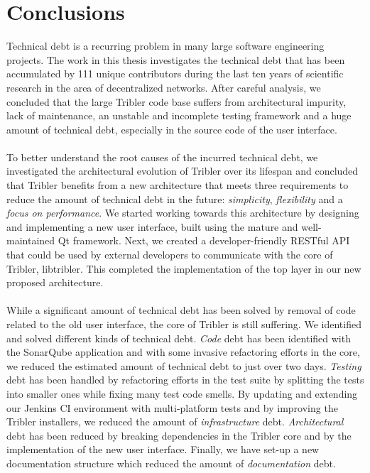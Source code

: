 \chapter{Conclusions}
\label{chapter:conclusions}

Technical debt is a recurring problem in many large software engineering projects. The work in this thesis investigates the technical debt that has been accumulated by 111 unique contributors during the last ten years of scientific research in the area of decentralized networks. After careful analysis, we concluded that the large Tribler code base suffers from architectural impurity, lack of maintenance, an unstable and incomplete testing framework and a huge amount of technical debt, especially in the source code of the user interface.\\\\
To better understand the root causes of the incurred technical debt, we investigated the architectural evolution of Tribler over its lifespan and concluded that Tribler benefits from a new architecture that meets three requirements to reduce the amount of technical debt in the future: \emph{simplicity}, \emph{flexibility} and a \emph{focus on performance}. We started working towards this architecture by designing and implementing a new user interface, built using the mature and well-maintained Qt framework. Next, we created a developer-friendly RESTful API that could be used by external developers to communicate with the core of Tribler, libtribler. This completed the implementation of the top layer in our new proposed architecture.\\\\
While a significant amount of technical debt has been solved by removal of code related to the old user interface, the core of Tribler is still suffering. We identified and solved different kinds of technical debt. \emph{Code} debt has been identified with the SonarQube application and with some invasive refactoring efforts in the core, we reduced the estimated amount of technical debt to just over two days. \emph{Testing} debt has been handled by refactoring efforts in the test suite by splitting the tests into smaller ones while fixing many test code smells. By updating and extending our Jenkins CI environment with multi-platform tests and by improving the Tribler installers, we reduced the amount of \emph{infrastructure} debt. \emph{Architectural} debt has been reduced by breaking dependencies in the Tribler core and by the implementation of the new user interface. Finally, we have set-up a new documentation structure which reduced the amount of \emph{documentation} debt.\\\\
